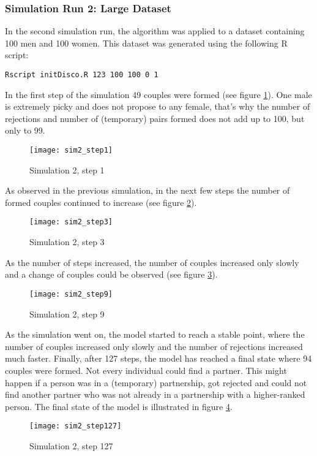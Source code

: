 \clearpage
\subsubsection{Simulation Run 2: Large Dataset}
In the second simulation run, the algorithm was applied to a dataset containing 100 men and 100 women. 
This dataset was generated using the following R script:
%
\begin{verbatim}
Rscript initDisco.R 123 100 100 0 1
\end{verbatim}
%
In the first step of the simulation 49 couples were formed (see figure \ref{fig:sim2_step1}). 
One male is extremely picky and does not propose to any female, 
that's why the number of rejections and number of (temporary) pairs formed does not add up to 100, but only to 99.
\begin{figure}[H]
  \centering
  \texttt{[image: sim2\_step1]}
	\caption{Simulation 2, step 1}
	\label{fig:sim2_step1}
\end{figure}

As observed in the previous simulation, in the next few steps the number of formed couples continued to increase (see figure \ref{fig:sim2_step3}).
\begin{figure}[H]
  \centering
  \texttt{[image: sim2\_step3]}
	\caption{Simulation 2, step 3}
	\label{fig:sim2_step3}
\end{figure}

As the number of steps increased, the number of couples increased only slowly and a change of couples could be observed (see figure \ref{fig:sim2_step9}).
\begin{figure}[H]
  \centering
  \texttt{[image: sim2\_step9]}
	\caption{Simulation 2, step 9}
	\label{fig:sim2_step9}
\end{figure}

As the simulation went on, the model started to reach a stable point, where the number of couples increased only slowly and the number of rejections increased much faster. 
Finally, after 127 steps, the model has reached a final state where 94 couples were formed. Not every individual could find a partner. This might happen if a person was in a (temporary) partnership, got rejected and could not find another partner who was not already in a partnership with a higher-ranked person.
The final state of the model is illustrated in figure \ref{fig:sim2_step127}.
\begin{figure}[H]
  \centering
  \texttt{[image: sim2\_step127]}
	\caption{Simulation 2, step 127}
	\label{fig:sim2_step127}
\end{figure}

